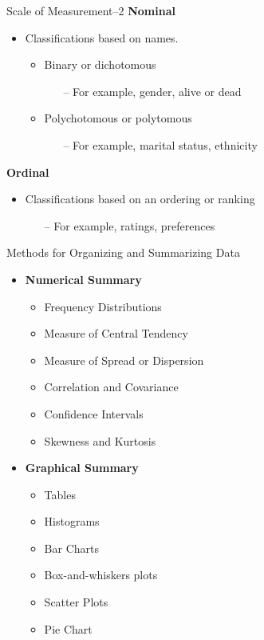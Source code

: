\begin{frame}[t]{Scale of Measurement--2}
	\textbf{Nominal}
	\begin{itemize}
		\item Classifications based on names.
		\begin{itemize}
			\item Binary or dichotomous
			\begin{itemize}
				\item [--]For example, gender, alive or dead
			\end{itemize}
		\end{itemize}
		
		\begin{itemize}
			\item Polychotomous or polytomous
			\begin{itemize}
				\item[--] For example, marital status, ethnicity
			\end{itemize}
		\end{itemize}
	\end{itemize}

\textbf{Ordinal}
\begin{itemize}
	\item Classifications based on an ordering or ranking
	\begin{itemize}
		\item [--]For example, ratings, preferences
	\end{itemize}
\end{itemize}
\end{frame}

\begin{frame}[t]{Methods for Organizing and Summarizing Data}
	\begin{itemize}
		\item \textbf{Numerical Summary}
		\begin{itemize}
			\item Frequency Distributions
			\item Measure of Central Tendency
			\item Measure of Spread or Dispersion
			\item Correlation and Covariance
			\item Confidence Intervals
			\item Skewness and Kurtosis 
		\end{itemize}
	\end{itemize}

	\begin{itemize}
		\item \textbf{Graphical Summary}
	\begin{itemize}
		\item Tables
		\item Histograms
		\item Bar Charts
		\item Box-and-whiskers plots
		\item Scatter Plots
		\item Pie Chart 
	\end{itemize}
	\end{itemize}
\end{frame}
